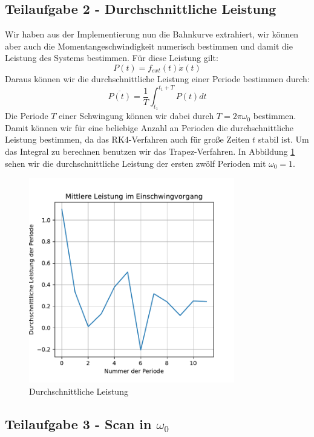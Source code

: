 \documentclass[12pt,a4paper]{article}
\begin{document}
\subsection{Teilaufgabe 2 - Durchschnittliche Leistung}
Wir haben aus der Implementierung nun die Bahnkurve extrahiert, wir können aber auch die Momentangeschwindigkeit numerisch bestimmen und damit die Leistung des Systems bestimmen. Für diese Leistung gilt:
\begin{equation*}
	P(t) = f_{ext}(t)\dot{x}(t)
\end{equation*}
Daraus können wir die durchschnittliche Leistung einer Periode bestimmen durch:
\begin{equation*}
	\overline{P(t)} = \frac{1}{T}\int_{t_1}^{t_1+T}P(t)dt
\end{equation*}
Die Periode $T$ einer Schwingung können wir dabei durch $T = 2\pi\omega_0$ bestimmen. Damit können wir für eine beliebige Anzahl an Perioden die durchschnittliche Leistung bestimmen, da das RK4-Verfahren auch für große Zeiten $t$ stabil ist. Um das Integral zu berechnen benutzen wir das Trapez-Verfahren. In  Abbildung \ref{f:power_avg} sehen wir die durchschnittliche Leistung der ersten zwölf Perioden mit $\omega_0=1$.
\begin{figure}
	\includegraphics[width=0.8\textwidth]{Einschwing.pdf}
	\caption{Durchschnittliche Leistung}\label{f:power_avg}
\end{figure}
\subsection{Teilaufgabe 3 - Scan in $\omega_0$}
\end{document}
